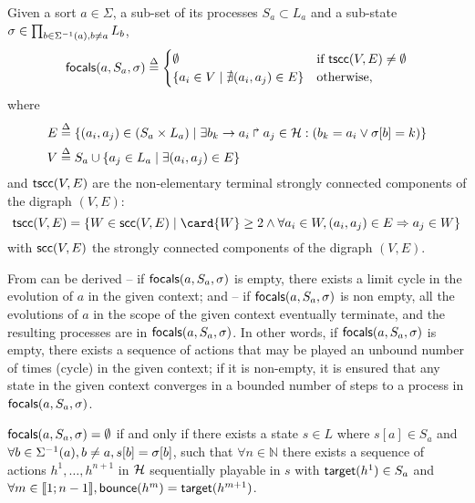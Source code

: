 \begin{definition}\label{def:focals}
Given a sort $a\in\Sigma$, a sub-set of its processes $S_a\subset L_a$ 
and a sub-state
$\sigma \in {\prod_{b\in\Sigma^{-1}(a), b\neq a} L_{b}}$,
\[
\mathsf{focals}(a,S_a,\sigma) \stackrel{\Delta}=
\begin{cases}
\emptyset & \text{if }\mathsf{tscc}(V,E)\neq\emptyset\\
\{ a_i \in V \mid \nexists (a_i,a_j)\in E\} & \text{otherwise,}
\end{cases}
\]
where
\begin{align}
E  & \stackrel{\Delta}= \{(a_i,a_j)\in (S_a \times L_a) \mid 
			\exists b_k\rightarrow a_i\Rsh a_j\in \mathcal{H}:
				(b_k = a_i \vee \sigma[b]=k) \}
\\
V & \stackrel{\Delta}= S_a \cup \{ a_j\in L_a\mid \exists (a_i,a_j)\in E\}
\end{align}
and $\mathsf{tscc}(V,E)$ are the non-elementary terminal strongly connected components of the digraph
$(V,E)$:
\[
\f{tscc}(V,E) = \{
W\in\f{scc}(V,E) \mid \card{W}\geq 2\wedge \forall a_i\in W, (a_i,a_j)\in E\Rightarrow a_j\in W\}
\]
with $\mathsf{scc}(V,E)$ the strongly connected components of the digraph $(V,E)$.
\end{definition}

From  can be derived 
 -- if $\mathsf{focals}(a,S_a,\sigma)$ is empty, there exists a limit cycle in the evolution of
$a$ in the given context;
and  -- if $\mathsf{focals}(a,S_a,\sigma)$ is non empty, all the evolutions of $a$ in the scope
of the given context eventually terminate, and the resulting processes are in $\mathsf{focals}(a,S_a,\sigma)$.
In other words, if $\mathsf{focals}(a,S_a,\sigma)$ is empty, there exists a
sequence of actions that may be played an unbound number of times (cycle) in the given context;
if it is non-empty, it is ensured that any state in the given context converges 
in a bounded number of steps to a process in $\mathsf{focals}(a,S_a,\sigma)$.

\begin{property}
\label{pro:no-focals}
$\mathsf{focals}(a,S_a,\sigma)=\emptyset$ if and only if
there exists a 
state $s\in L$
where
$s[a]\in S_a$ and
$\forall b\in \Sigma^{-1}(a), b\neq a, s[b] = \sigma[b]$,
such that
$\forall n\in \mathbb N$
there 
exists a sequence of actions $h^1,\dots,h^{n+1}$ in $\mathcal{H}$
sequentially playable in $s$ with
$\mathsf{target}(h^1)\in S_a$ and
$\forall m\in\llbracket 1 ; n-1 \rrbracket, \mathsf{bounce}(h^m)=\mathsf{target}(h^{m+1})$.
\end{property}

